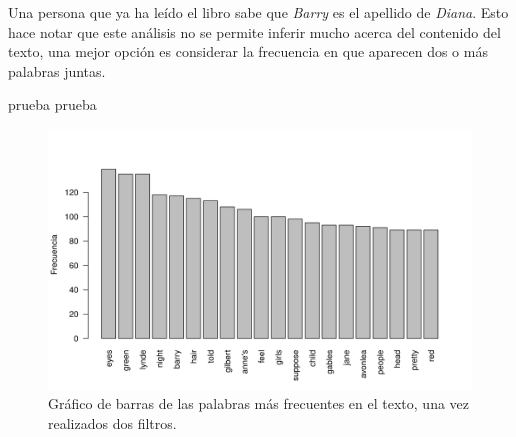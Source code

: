 \documentclass[12pt]{article}
\begin{document}
	Una persona que ya ha leído el libro sabe que \textit{Barry} es el apellido de \textit{Diana}. Esto hace notar que este análisis no se permite inferir mucho acerca del contenido del texto, una mejor opción es considerar la frecuencia en que aparecen dos o más palabras juntas.
	
	prueba prueba
	
	\begin{figure}
		\centering
		\includegraphics[scale=0.7]{palabras_decreciente_log3.png}
		\caption{Gráfico de barras de las palabras más frecuentes en el texto, una vez realizados dos filtros.}
		\label{palabras_dec}
	\end{figure}


\end{document}
